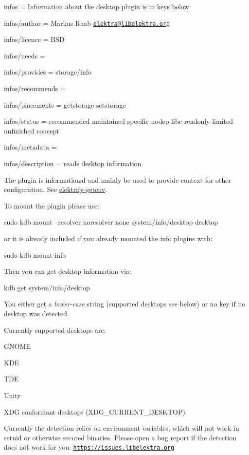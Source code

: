 
\begin{DoxyItemize}
\item infos = Information about the desktop plugin is in keys below
\item infos/author = Markus Raab \href{mailto:elektra@libelektra.org}{\tt elektra@libelektra.\+org}
\item infos/licence = B\+SD
\item infos/needs =
\item infos/provides = storage/info
\item infos/recommends =
\item infos/placements = getstorage setstorage
\item infos/status = recommended maintained specific nodep libc readonly limited unfinished concept
\item infos/metadata =
\item infos/description = reads desktop information
\end{DoxyItemize}

The plugin is informational and mainly be used to provide context for other configuration. See \hyperlink{src_libs_getenv_README_md}{elektrify-\/getenv}.

To mount the plugin please use\+:


\begin{DoxyCode}
sudo kdb mount --resolver noresolver none system/info/desktop desktop
\end{DoxyCode}


or it is already included if you already mounted the info plugins with\+:


\begin{DoxyCode}
sudo kdb mount-info
\end{DoxyCode}


Then you can get desktop information via\+:


\begin{DoxyCode}
kdb get system/info/desktop
\end{DoxyCode}


You either get a {\itshape lower-\/case} string (supported desktops see below) or no key if no desktop was detected.

Currently supported desktops are\+:


\begin{DoxyItemize}
\item G\+N\+O\+ME
\item K\+DE
\item T\+DE
\item Unity
\item X\+DG conformant desktops ({\ttfamily X\+D\+G\+\_\+\+C\+U\+R\+R\+E\+N\+T\+\_\+\+D\+E\+S\+K\+T\+OP})
\end{DoxyItemize}

Currently the detection relies on environment variables, which will not work in setuid or otherwise secured binaries. Please open a bug report if the detection does not work for you\+: \href{https://issues.libelektra.org}{\tt https\+://issues.\+libelektra.\+org} 